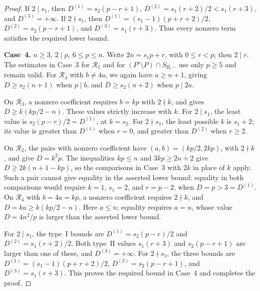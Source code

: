 \documentclass[11pt,a4paper]{amsart}
\theoremstyle{plain}
\numberwithin{equation}{section}
\newenvironment{pf}{\begin{proof}}{\end{proof}}
\begin{document}
\begin{pf}
	If \(2\mid s_1\), then \(D^{(1)}=s_2(p-r+1)\),
	\(D^{(2)}=s_1(r+2)/2<s_1(r+3)\), and \(D^{(3)}=+\infty\).
	If \(2\nmid s_1\), then
	\(D^{(1)}=(s_1-1)(p+r+2)/2\), \(D^{(2)}=s_2(p-r+1)\),
	and \(D^{(3)}=s_1(r+3)\). Thus every nonzero term satisfies the
	required lower bound.
	
	\smallskip
	
	\noindent\textbf{Case~4.} \(n\ge3,\ 2\mid p,\ 6\le p\le n\).
	Write \(2n=s_1p+r\), with \(0\le r<p\); then \(2\mid r\).
	The estimates in Case~3 for \(\mathcal R_1\) and for
	\((P'\setminus P)\cap S_{\mathrm{II},-}\) use only \(p\ge5\)
	and remain valid. For \(\mathcal R_4\) with \(b\ne4a\),
	we again have \(a\ge n+1\), giving
	\(D\ge s_2(n+1)\) when \(p\mid b\), and
	\(D\ge s_2(n+2)\) when \(p\mid2a\).
	
	On \(\mathcal R_3\), a nonzero coefficient requires
	\(b=kp\) with \(2\nmid k\), and gives \(D\ge k(kp/2-n)\).
	These values strictly increase with \(k\). For \(2\mid s_1\),
	the least value is \(s_2(p-r)/2=D^{(1)}\), at \(k=s_2\).
	For \(2\nmid s_1\), the least possible \(k\) is \(s_1+2\);
	its value is greater than \(D^{(1)}\) when \(r=0\), and
	greater than \(D^{(2)}\) when \(r\ge2\).
	
	On \(\mathcal R_2\), the pairs with nonzero coefficient have
	\((a,b)=(kp/2,2kp)\), with \(2\nmid k\), and give \(D=k^2p\).
	The inequalities \(kp\le n\) and \(3kp\ge2n+2\) give
	\(D\ge2k(n+1-kp)\), so the comparisons in Case~3 with \(2k\)
	in place of \(k\) apply. Such a pair cannot give equality in
	the asserted lower bound: equality in both comparisons would require
	\(k=1\), \(s_1=2\), and \(r=p-2\), when
	\(D=p>3=D^{(1)}\).
	On \(\mathcal R_4\) with \(b=4a=kp\), a nonzero coefficient
	requires \(2\nmid k\), and \(D=ka\ge k(kp/2-n)\).
	Here \(a\le n\); equality requires \(a=n\), whose value
	\(D=4n^2/p\) is larger than the asserted lower bound.
	
	For \(2\mid s_1\), the type~\(\mathrm I\) bounds are
	\(D^{(1)}=s_2(p-r)/2\) and \(D^{(2)}=s_1(r+2)/2\).
	Both type~\(\mathrm{II}\) values \(s_1(r+3)\) and
	\(s_2(p-r+1)\) are larger than one of these, and
	\(D^{(3)}=+\infty\). For \(2\nmid s_1\), the three bounds
	are \(D^{(1)}=(s_1-1)(p+r+2)/2\),
	\(D^{(2)}=s_2(p-r+1)\), and \(D^{(3)}=s_1(r+3)\).
	This proves the required bound in Case~4 and completes the proof.
\end{pf}
\end{document}
